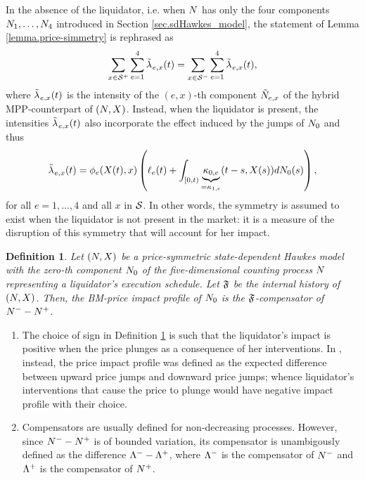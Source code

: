 \documentclass[10pt, article,table]{article}
\newtheorem{defi}[thm]{Definition}
\begin{document}
 In the absence of the liquidator, i.e. when $\multiCountingProc$ has only the four components $\countingProc[1], \dots, \countingProc[4]$ introduced in Section \ref{sec.sdHawkes_model}, the statement of Lemma \ref{lemma.price-simmetry} is rephrased as 
 \begin{equation*}
  \sum_{x\in\inflationarySpace}\sum_{e=1}^{4}\hybridIntensity_{e,x}(t)
  =
  \sum_{x\in\deflationarySpace}\sum_{e=1}^{4}\hybridIntensity_{e,x}(t),
 \end{equation*}
where $\hybridIntensity_{e,x}(t)$ is the intensity of the $(e,x)$-th component $\hybridHawkes_{e,x}$ of the hybrid MPP-counterpart of $\sdHawkesPair$. Instead, when the liquidator is present, the intensities $\hybridIntensity_{e,x}(t)$ also incorporate the effect  induced by the jumps of $\countingProc[0]$ and thus 
\begin{equation*}
 \hybridIntensity_{e,x}(t) = \transProb_e(\stateVariable(t),x)
 \left(\ell_{e}(t) + \int_{[0,t)}\underbrace{\hawkesKernel_{0,e}}_{=\hawkesKernel_{1,e}}(t-s,\stateVariable(s))d\countingProc[0](s)
 \right),
\end{equation*}
for all $e=1,\dots,4$ and all $x$ in $\stateSpace$. 
In other words, the symmetry is assumed to exist when the liquidator is not present in the market: it is a measure of the disruption of this symmetry that will account for her impact.

\begin{defi}\label{def.BM_impact}
 Let $\sdHawkesPair$ be a price-symmetric state-dependent Hawkes model with the zero-th component $\countingProc[0]$ of the five-dimensional counting process $\multiCountingProc$ representing a liquidator's execution schedule. Let $\internalHistory$ be the internal history of $\sdHawkesPair$. Then, the BM-price impact profile of $\countingProc[0]$ is the $\internalHistory$-compensator of $\Nminus - \Nplus$. 
\end{defi}

\begin{remark}
\begin{enumerate}[label=\roman{*}.]
 \item 
 The choice of sign in Definition \ref{def.BM_impact} is such that the liquidator's impact is positive when the price plunges as a consequence of her interventions. In \citealp{BM14haw}, instead, the price impact profile was defined as the expected difference between upward price jumps and downward price jumps; whence liquidator's interventions that cause the price to plunge would have negative impact profile with their choice. 
 \item 
 Compensators are usually defined for non-decreasing processes. However, since $\countingProc[]^{-} - \countingProc[]^{+}$ is of bounded variation, its compensator is unambigously defined as the difference $\compensator^{-}-\compensator^{+}$, where $\compensator^{-}$ is the compensator of $\Nminus$ and $\compensator^{+}$ is the compensator of $\Nplus$.
\end{enumerate}
\end{remark}
\end{document}
